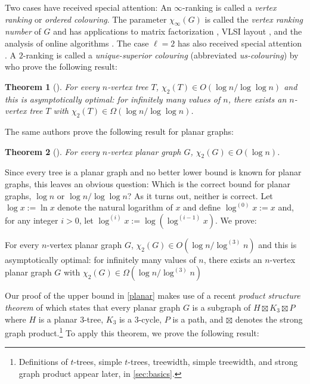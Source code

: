 \documentclass[kpfonts]{patmorin}
\newcommand{\trn}{\chi_2}
\newtheorem{othertheorem}{Theorem}
\theoremstyle{named}
\begin{document}
Two cases have received special attention: An $\infty$-ranking is called a \emph{vertex ranking} or \emph{ordered colouring}. The parameter $\chi_\infty(G)$ is called the \emph{vertex ranking number} of $G$ and has applications to matrix factorization \cite{bodlaender.gilbert.ea:approximating,duff.reid:multifrontal,liu:role,dereniowski.kubale:cholesky}, VLSI layout \cite{leiserson:area,sen.deng.ea:on}, and the analysis of online algorithms \cite{even.smorodinsky:hitting}. The case $\ell=2$ has also received special attention \cite{almeter.demircan.ea:graph,karpas.neiman.ea:on,shalu.antony:complexity}. A $2$-ranking is called a \emph{unique-superior colouring} (abbreviated \emph{us-colouring}) by \citet{karpas.neiman.ea:on} who prove the following result:

\setcounter{othertheorem}{19}
\begin{othertheorem}[\cite{karpas.neiman.ea:on}]\label{trees}
    For every $n$-vertex tree $T$, $\trn(T)\in O(\log n/\log\log n)$ and this is asymptotically optimal: for infinitely many values of $n$, there exists an $n$-vertex tree $T$ with $\trn(T)\in\Omega(\log n/\log\log n)$.
\end{othertheorem}

The same authors prove the following result for planar graphs:

\setcounter{othertheorem}{15}
\begin{othertheorem}[\cite{karpas.neiman.ea:on}]\label{planar-graphs}
    For every $n$-vertex planar graph $G$, $\trn(G)\in O(\log n)$.
\end{othertheorem}

Since every tree is a planar graph and no better lower bound is known for planar graphs, this leaves an obvious question:  Which is the correct bound for planar graphs, $\log n$ or $\log n/\log\log n$?  As it turns out, neither is correct.  Let $\log x :=\ln x$ denote the natural logarithm of $x$ and define $\log^{(0)}x:=x$ and, for any integer $i>0$, let $\log^{(i)}x:=\log(\log^{(i-1)} x)$. We prove:


\begin{thm}\label{planar}
    For every $n$-vertex planar graph $G$, $\trn(G)\in O(\log n/\log^{(3)} n)$ and this is asymptotically optimal: for infinitely many values of $n$, there exists an $n$-vertex planar graph $G$ with $\trn(G)\in \Omega(\log n/\log^{(3)} n)$
\end{thm}

Our proof of the upper bound in \cref{planar} makes use of a recent \emph{product structure theorem} of \citet{dujmovic.joret.ea:planar} which states that every planar graph $G$ is a subgraph of $H\boxtimes K_3\boxtimes P$ where $H$ is a planar $3$-tree, $K_3$ is a 3-cycle, $P$ is a path, and $\boxtimes$ denotes the strong graph product.\footnote{Definitions of $t$-trees, simple $t$-trees, treewidth, simple treewidth, and strong graph product appear later, in \cref{sec:basics}.}  To apply this theorem, we prove the following result:
\end{document}
